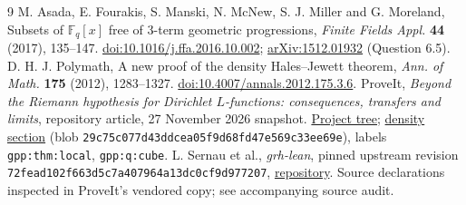 \documentclass[11pt]{article}
\theoremstyle{remark}\newtheorem{remark}[theorem]{Remark}
\begin{document}
\begin{thebibliography}{9}
 M. Asada, E. Fourakis, S. Manski, N. McNew, S. J. Miller and G. Moreland, Subsets of $\mathbb F_q[x]$ free of 3-term geometric progressions, \emph{Finite Fields Appl.} \textbf{44} (2017), 135--147. \href{https://doi.org/10.1016/j.ffa.2016.10.002}{doi:10.1016/j.ffa.2016.10.002}; \href{https://arxiv.org/abs/1512.01932}{arXiv:1512.01932} (Question 6.5).
 D. H. J. Polymath, A new proof of the density Hales--Jewett theorem, \emph{Ann. of Math.} \textbf{175} (2012), 1283--1327. \href{https://doi.org/10.4007/annals.2012.175.3.6}{doi:10.4007/annals.2012.175.3.6}.
 ProveIt, \emph{Beyond the Riemann hypothesis for Dirichlet $L$-functions: consequences, transfers and limits}, repository article, 27 November 2026 snapshot. \href{https://github.com/VladimirReshetnikov/ProveIt/tree/main/Analysis/GeneralizedRiemannHypothesis}{Project tree}; \href{https://github.com/VladimirReshetnikov/ProveIt/blob/main/Analysis/GeneralizedRiemannHypothesis/Article/sections/gpp.tex}{density section} (blob \texttt{29c75c077d43ddcea05f9d68fd47e569c33ee69e}), labels \texttt{gpp:thm:local}, \texttt{gpp:q:cube}.
 L. Sernau et al., \emph{grh-lean}, pinned upstream revision \texttt{72fead102f663d5c7a407964a13dc0cf9d977207}, \href{https://github.com/lsernau/grh-lean}{repository}. Source declarations inspected in ProveIt's vendored copy; see accompanying source audit.
\end{thebibliography}
\end{document}

